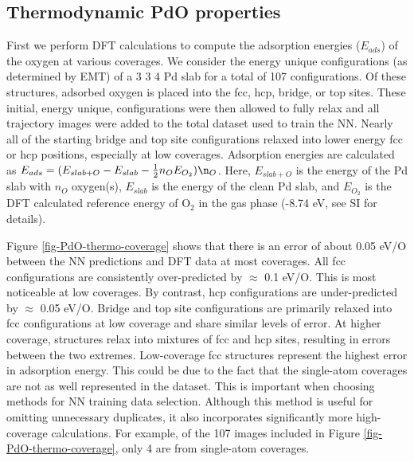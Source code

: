 \documentclass[12pt]{cmuthesis}
\begin{document}
\subsection{Thermodynamic PdO properties}
\label{sec:orgda4e362}
First we perform DFT calculations to compute the adsorption energies (\(E_{ads}\)) of the oxygen at various coverages. We consider the energy unique configurations (as determined by EMT) of a 3 \texttimes{} 3 \texttimes{} 4 Pd slab for a total of 107 configurations. Of these structures, adsorbed oxygen is placed into the fcc, hcp, bridge, or top sites. These initial, energy unique, configurations were then allowed to fully relax and all trajectory images were added to the total dataset used to train the NN. Nearly all of the starting bridge and top site configurations relaxed into lower energy fcc or hcp positions, especially at low coverages. Adsorption energies are calculated as \(E_{ads} = (E_{slab+O} - E_{slab} - \frac{1}{2} n_{O} E_{O_{2}})\n_{O}\). Here, \(E_{slab+O}\) is the energy of the Pd slab with \(n_{O}\) oxygen(s), \(E_{slab}\) is the energy of the clean Pd slab, and \(E_{O_{2}}\) is the DFT calculated reference energy of O\(_{\text{2}}\) in the gas phase (-8.74 eV, see SI for details).

Figure \ref{fig-PdO-thermo-coverage} shows that there is an error of about 0.05 eV/O between the NN predictions and DFT data at most coverages. All fcc configurations are consistently over-predicted by \(\approx\) 0.1 eV/O. This is most noticeable at low coverages. By contrast, hcp configurations are under-predicted by \(\approx\) 0.05 eV/O. Bridge and top site configurations are primarily relaxed into fcc configurations at low coverage and share similar levels of error. At higher coverage, structures relax into mixtures of fcc and hcp sites, resulting in errors between the two extremes. Low-coverage fcc structures represent the highest error in adsorption energy. This could be due to the fact that the single-atom coverages are not as well represented in the dataset. This is important when choosing methods for NN training data selection. Although this method is useful for omitting unnecessary duplicates, it also incorporates significantly more high-coverage calculations. For example, of the 107 images included in Figure \ref{fig-PdO-thermo-coverage}, only 4 are from single-atom coverages.
\end{document}
